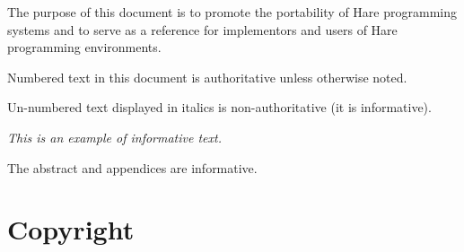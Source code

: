 
\specitem
The purpose of this document is to promote the portability of Hare programming
systems and to serve as a reference for implementors and users of Hare
programming environments.

\specitem
Numbered text in this document is authoritative unless otherwise noted.

\specitem
Un-numbered text displayed in italics is non-authoritative (it is informative).

\textit{This is an example of informative text.}

\specitem
The abstract and appendices are informative.

\section{Copyright}

